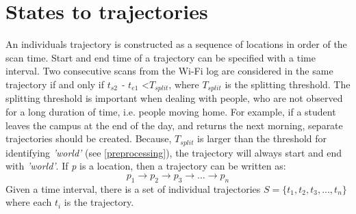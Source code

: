 \section{States to trajectories}\label{statesToTrajectories}
An individuals trajectory is constructed as a sequence of locations in order of the scan time. Start and end time of a trajectory can be specified with a time interval. Two consecutive scans from the Wi-Fi log are considered in the same trajectory if and only if \textit{$t_{s2}$ - $t_{e1}$} \textless \textit{$T_{split}$}, where \textit{$T_{split}$} is the splitting threshold. The splitting threshold is important when dealing with people, who are not observed for a long duration of time, i.e. people moving home. For example, if a student leaves the campus at the end of the day, and returns the next morning, separate trajectories should be created. Because, \textit{$T_{split}$} is larger than the threshold for identifying \textit{'world'} (see \autoref{preprocessing}), the trajectory will always start and end with \textit{'world'}. If \textit{p} is a location, then a trajectory can be written as:
$$p_{1} \rightarrow p_{2} \rightarrow p_{3} \rightarrow … \rightarrow p_{n}$$
Given a time interval, there is a set of individual trajectories $\textit{S} = \{t_{1}, t_{2}, t_{3},...,t_{n}\}$ where each $t_{i}$ is the trajectory.
